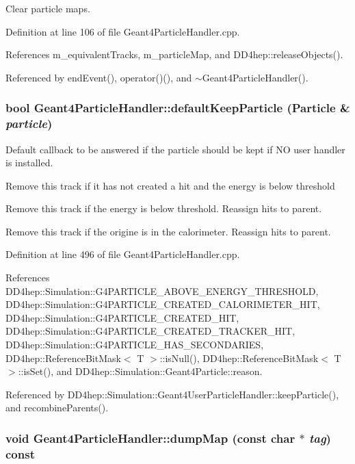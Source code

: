 Clear particle maps. 

Definition at line 106 of file Geant4ParticleHandler.cpp.

References m\_\-equivalentTracks, m\_\-particleMap, and DD4hep::releaseObjects().

Referenced by endEvent(), operator()(), and $\sim$Geant4ParticleHandler().\hypertarget{class_d_d4hep_1_1_simulation_1_1_geant4_particle_handler_a1d0fdcaf979ddb882519706a3963f54f}{
\subsubsection[{defaultKeepParticle}]{\setlength{\rightskip}{0pt plus 5cm}bool Geant4ParticleHandler::defaultKeepParticle ({\bf Particle} \& {\em particle})}}
\label{class_d_d4hep_1_1_simulation_1_1_geant4_particle_handler_a1d0fdcaf979ddb882519706a3963f54f}


Default callback to be answered if the particle should be kept if NO user handler is installed. 

Remove this track if it has not created a hit and the energy is below threshold

Remove this track if the energy is below threshold. Reassign hits to parent.

Remove this track if the origine is in the calorimeter. Reassign hits to parent. 

Definition at line 496 of file Geant4ParticleHandler.cpp.

References DD4hep::Simulation::G4PARTICLE\_\-ABOVE\_\-ENERGY\_\-THRESHOLD, DD4hep::Simulation::G4PARTICLE\_\-CREATED\_\-CALORIMETER\_\-HIT, DD4hep::Simulation::G4PARTICLE\_\-CREATED\_\-HIT, DD4hep::Simulation::G4PARTICLE\_\-CREATED\_\-TRACKER\_\-HIT, DD4hep::Simulation::G4PARTICLE\_\-HAS\_\-SECONDARIES, DD4hep::ReferenceBitMask$<$ T $>$::isNull(), DD4hep::ReferenceBitMask$<$ T $>$::isSet(), and DD4hep::Simulation::Geant4Particle::reason.

Referenced by DD4hep::Simulation::Geant4UserParticleHandler::keepParticle(), and recombineParents().\hypertarget{class_d_d4hep_1_1_simulation_1_1_geant4_particle_handler_a4bf2afae6d47cd578f8cbccbbc765e25}{
\subsubsection[{dumpMap}]{\setlength{\rightskip}{0pt plus 5cm}void Geant4ParticleHandler::dumpMap (const char $\ast$ {\em tag}) const}}
\label{class_d_d4hep_1_1_simulation_1_1_geant4_particle_handler_a4bf2afae6d47cd578f8cbccbbc765e25}



